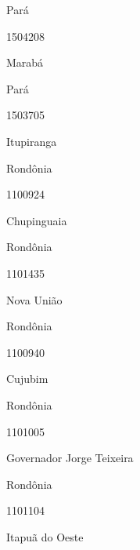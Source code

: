 \documentclass[
  letterpaper,
]{report}
\begin{document}
Pará

\n      

1504208

\n      

Marabá

\n    

\n    

\n      

Pará

\n      

1503705

\n      

Itupiranga

\n    

\n    

\n      

Rondônia

\n      

1100924

\n      

Chupinguaia

\n    

\n    

\n      

Rondônia

\n      

1101435

\n      

Nova União

\n    

\n    

\n      

Rondônia

\n      

1100940

\n      

Cujubim

\n    

\n    

\n      

Rondônia

\n      

1101005

\n      

Governador Jorge Teixeira

\n    

\n    

\n      

Rondônia

\n      

1101104

\n      

Itapuã do Oeste
\end{document}
